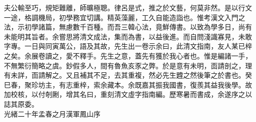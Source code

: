\documentclass{article}
\begin{document}
夫公輸至巧，規矩難離，師曠極聰。律呂是式，推之於文藝，何莫非然。是以行文一途，格調機局，初學務宜切講。精英藻麗，工久自能造詣也。惟考漢文入門之法，示初學諸篇，無慮數千百種。而吾三韓心法，竟鮮傳書。以致為學多日，尚有未能明其旨者。余嘗思將清文成法，集而為書，以益後進。而自問淺識寡見，未敢字專。一日與同寅萬公，語及其故，先生出一卷示余曰，此清文指南，友人某已梓之矣。余展卷讀之，愛不釋手。先生之意，蓋先有獲於我心者也。惟是編諸一手，不無繁衍簡略之虞。鈔假多人，間有魯魚亥豕之弊。於是意有未明，靣請剖之，理有未詳，靣請解之。又且補其不足，去其重複，然必先生韙之然後筆之於書也。癸巳春，聚珍坊主，有志重梓，索余藏本。余既嘉其振我國書，復羨其益我後學。故加校核，以付剞劂，增其名曰，重刻清文虛字指南編。歷寒暑而書成，余遂序之以誌其原委。\\

\noindent 光緒二十年孟春之月漢軍鳳山序




\end{document}
